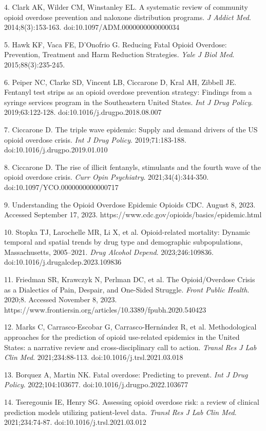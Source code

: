 4. Clark AK, Wilder CM, Winstanley EL. A systematic review of community opioid overdose prevention and naloxone distribution programs. \emph{J Addict Med}. 2014;8(3):153-163. doi:10.1097/ADM.0000000000000034

5. Hawk KF, Vaca FE, D'Onofrio G. Reducing Fatal Opioid Overdose: Prevention, Treatment and Harm Reduction Strategies. \emph{Yale J Biol Med}. 2015;88(3):235-245.

6. Peiper NC, Clarke SD, Vincent LB, Ciccarone D, Kral AH, Zibbell JE. Fentanyl test strips as an opioid overdose prevention strategy: Findings from a syringe services program in the Southeastern United States. \emph{Int J Drug Policy}. 2019;63:122-128. doi:10.1016/j.drugpo.2018.08.007

7. Ciccarone D. The triple wave epidemic: Supply and demand drivers of the US opioid overdose crisis. \emph{Int J Drug Policy}. 2019;71:183-188. doi:10.1016/j.drugpo.2019.01.010

8. Ciccarone D. The rise of illicit fentanyls, stimulants and the fourth wave of the opioid overdose crisis. \emph{Curr Opin Psychiatry}. 2021;34(4):344-350. doi:10.1097/YCO.0000000000000717

9. Understanding the Opioid Overdose Epidemic \textbar{} Opioids \textbar{} CDC. August 8, 2023. Accessed September 17, 2023. https://www.cdc.gov/opioids/basics/epidemic.html

10. Stopka TJ, Larochelle MR, Li X, et al. Opioid-related mortality: Dynamic temporal and spatial trends by drug type and demographic subpopulations, Massachusetts, 2005--2021. \emph{Drug Alcohol Depend}. 2023;246:109836. doi:10.1016/j.drugalcdep.2023.109836

11. Friedman SR, Krawczyk N, Perlman DC, et al. The Opioid/Overdose Crisis as a Dialectics of Pain, Despair, and One-Sided Struggle. \emph{Front Public Health}. 2020;8. Accessed November 8, 2023. https://www.frontiersin.org/articles/10.3389/fpubh.2020.540423

12. Marks C, Carrasco-Escobar G, Carrasco-Hernández R, et al. Methodological approaches for the prediction of opioid use-related epidemics in the United States: a narrative review and cross-disciplinary call to action. \emph{Transl Res J Lab Clin Med}. 2021;234:88-113. doi:10.1016/j.trsl.2021.03.018

13. Borquez A, Martin NK. Fatal overdose: Predicting to prevent. \emph{Int J Drug Policy}. 2022;104:103677. doi:10.1016/j.drugpo.2022.103677

14. Tseregounis IE, Henry SG. Assessing opioid overdose risk: a review of clinical prediction models utilizing patient-level data. \emph{Transl Res J Lab Clin Med}. 2021;234:74-87. doi:10.1016/j.trsl.2021.03.012

